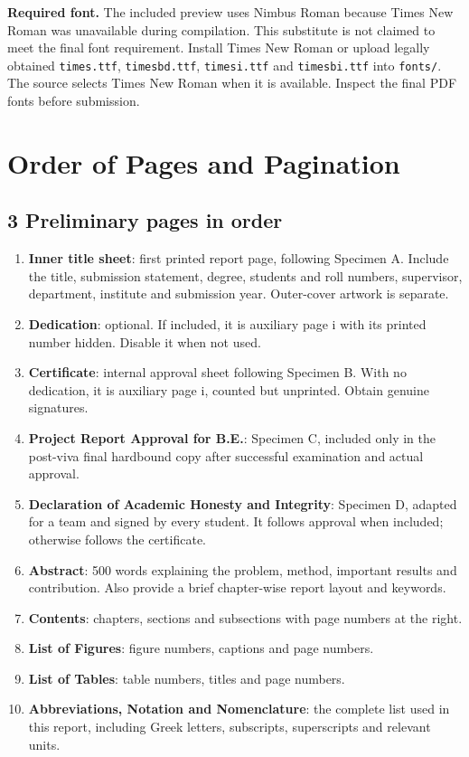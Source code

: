 \documentclass[11pt,a4paper]{article}
\newcommand{\Page}[1]{\clearpage\section*{#1}}
\newcommand{\Key}[1]{\textbf{#1}}
\begin{document}
\Key{Required font.} The included preview uses Nimbus Roman because Times New
Roman was unavailable during compilation. This substitute is not claimed to
meet the final font requirement. Install Times New Roman or upload legally
obtained \texttt{times.ttf}, \texttt{timesbd.ttf}, \texttt{timesi.ttf} and
\texttt{timesbi.ttf} into \texttt{fonts/}. The source selects Times New Roman
when it is available. Inspect the final PDF fonts before submission.

\Page{Order of Pages and Pagination}
\subsection*{3 Preliminary pages in order}
\begin{enumerate}
\item \Key{Inner title sheet}: first printed report page, following Specimen A.
Include the title, submission statement, degree, students and roll numbers,
supervisor, department, institute and submission year. Outer-cover artwork is separate.
\item \Key{Dedication}: optional. If included, it is auxiliary page i with its
printed number hidden. Disable it when not used.
\item \Key{Certificate}: internal approval sheet following Specimen B. With no
dedication, it is auxiliary page i, counted but unprinted. Obtain genuine signatures.
\item \Key{Project Report Approval for B.E.}: Specimen C, included only in the
post-viva final hardbound copy after successful examination and actual approval.
\item \Key{Declaration of Academic Honesty and Integrity}: Specimen D, adapted
for a team and signed by every student. It follows approval when included;
otherwise follows the certificate.
\item \Key{Abstract}: 500 words explaining the problem, method, important results
and contribution. Also provide a brief chapter-wise report layout and keywords.
\item \Key{Contents}: chapters, sections and subsections with page numbers at the right.
\item \Key{List of Figures}: figure numbers, captions and page numbers.
\item \Key{List of Tables}: table numbers, titles and page numbers.
\item \Key{Abbreviations, Notation and Nomenclature}: the complete list used in
this report, including Greek letters, subscripts, superscripts and relevant units.
\end{enumerate}
\end{document}
